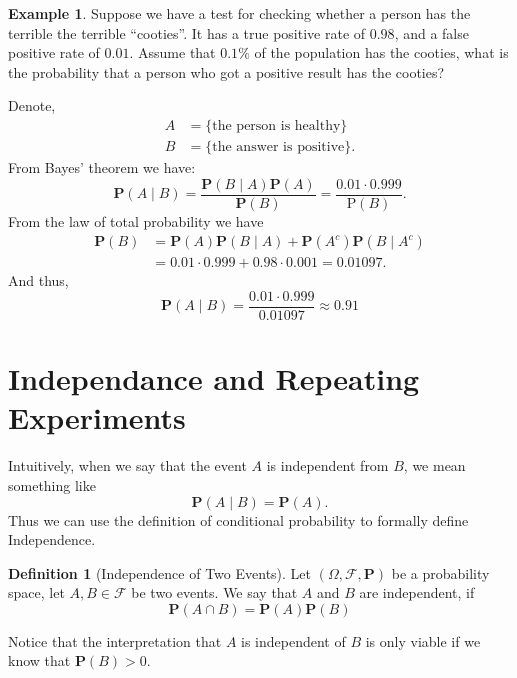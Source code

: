 \documentclass[11pt,a4paper]{article}
\theoremstyle{definition}
\newtheorem{definition}{Definition}[section]
\newtheorem{example}{Example}[section]
\theoremstyle{plain}
\newcommand{\Prob}{\mathbf{P}}
\begin{document}
  \begin{example}
    Suppose we have a test for checking whether a person has the terrible 
    the terrible ``cooties''.
    It has a true positive rate of $0.98$, and a false positive rate of
    $0.01$. Assume that $0.1\%$ of the population has the cooties,
    what is the probability that a person who got a positive result
    has the cooties?

    Denote,
    \begin{align*}
      A &= \{\text{the person is healthy}\} \\
      B &= \{\text{the answer is positive}\}.
    \end{align*}
    From Bayes' theorem we have:
    \[
      \Prob(A \mid B) = 
      {\frac{\Prob(B \mid A)\Prob(A)}{\Prob(B)}} = 
      {\frac{0.01\cdot0.999}{\mathrm{P}(B)}}.
    \]
    From the law of total probability we have
    \begin{align*}
      \Prob(B) &= 
      \Prob(A)\Prob(B \mid A) + 
      \Prob(A^{c})\Prob(B \mid A^{c}) \\ &= 
      0.01\cdot0.999+0.98\cdot0.001=0.01097.
    \end{align*}
    And thus,
    \[ \Prob(A \mid B)={\frac{0.01\cdot0.999}{0.01097}} \approx 0.91 \]
  \end{example}


  \newpage

  \section{Independance and Repeating Experiments}
  Intuitively, when we say that the event $A$ is independent from $B$,
  we mean something like
  \[
    \Prob(A \mid B) = \Prob(A).
  \]
  Thus we can use the definition of conditional probability to formally define
  Independence.
  \begin{definition}[Independence of Two Events]
    Let $(\Omega, \mathcal F, \Prob)$ be a probability space, let 
    $A,B \in \mathcal F$ be two events. We say that $A$ and $B$ are independent,
    if
    \[
      \Prob(A \cap B) = \Prob(A) \Prob(B)
    \]
  \end{definition}
  Notice that the interpretation that $A$ is independent of $B$ is only viable
  if we know that $\Prob(B) > 0$.

\end{document}

